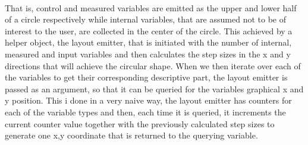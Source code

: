 \\\newline That is, control and measured variables are emitted as the upper and lower half of a circle respectively while internal variables, that are assumed not to be of interest to the user, are collected in the center of the circle. This achieved by a helper object, the layout emitter, that is initiated with the number of internal, measured and input variables and then calculates the step sizes in the x and y directions that will achieve the circular shape. When we then iterate over each of the variables to get their corresponding descriptive part, the layout emitter is passed as an argument, so that it can be queried for the variables graphical x and y position. This i done in a very naive way, the layout emitter has counters for each of the variable types and then, each time it is queried, it increments the current counter value together with the previously calculated step sizes to generate one x,y coordinate that is returned to the querying variable. 

